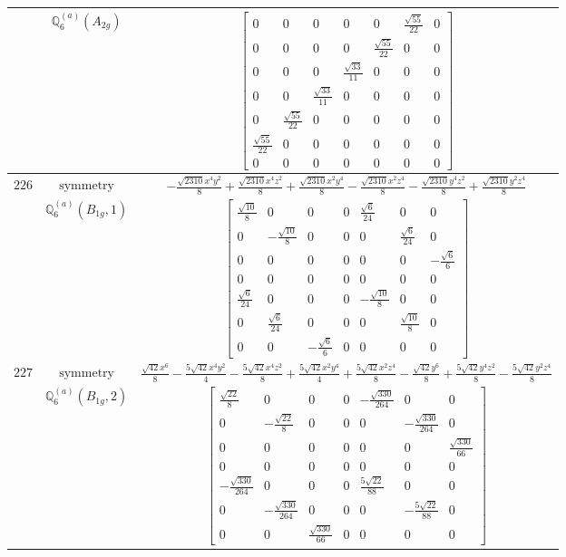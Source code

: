\documentclass[fleqn,8pt,landscape]{jsarticle}
\begin{document}
\begin{longtable}{ccc}
$  $ & $ \mathbb{Q}_{6}^{(a)}(A_{2g}) $ & $ \begin{bmatrix} 0 & 0 & 0 & 0 & 0 & \frac{\sqrt{55}}{22} & 0 \\ 0 & 0 & 0 & 0 & \frac{\sqrt{55}}{22} & 0 & 0 \\ 0 & 0 & 0 & \frac{\sqrt{33}}{11} & 0 & 0 & 0 \\ 0 & 0 & \frac{\sqrt{33}}{11} & 0 & 0 & 0 & 0 \\ 0 & \frac{\sqrt{55}}{22} & 0 & 0 & 0 & 0 & 0 \\ \frac{\sqrt{55}}{22} & 0 & 0 & 0 & 0 & 0 & 0 \\ 0 & 0 & 0 & 0 & 0 & 0 & 0 \end{bmatrix} $ \\ \hline
$ 226 $ & $ \text{symmetry} $ & $ - \frac{\sqrt{2310} x^{4} y^{2}}{8} + \frac{\sqrt{2310} x^{4} z^{2}}{8} + \frac{\sqrt{2310} x^{2} y^{4}}{8} - \frac{\sqrt{2310} x^{2} z^{4}}{8} - \frac{\sqrt{2310} y^{4} z^{2}}{8} + \frac{\sqrt{2310} y^{2} z^{4}}{8} $ \\
$  $ & $ \mathbb{Q}_{6}^{(a)}(B_{1g},1) $ & $ \begin{bmatrix} \frac{\sqrt{10}}{8} & 0 & 0 & 0 & \frac{\sqrt{6}}{24} & 0 & 0 \\ 0 & - \frac{\sqrt{10}}{8} & 0 & 0 & 0 & \frac{\sqrt{6}}{24} & 0 \\ 0 & 0 & 0 & 0 & 0 & 0 & - \frac{\sqrt{6}}{6} \\ 0 & 0 & 0 & 0 & 0 & 0 & 0 \\ \frac{\sqrt{6}}{24} & 0 & 0 & 0 & - \frac{\sqrt{10}}{8} & 0 & 0 \\ 0 & \frac{\sqrt{6}}{24} & 0 & 0 & 0 & \frac{\sqrt{10}}{8} & 0 \\ 0 & 0 & - \frac{\sqrt{6}}{6} & 0 & 0 & 0 & 0 \end{bmatrix} $ \\ \hline
$ 227 $ & $ \text{symmetry} $ & $ \frac{\sqrt{42} x^{6}}{8} - \frac{5 \sqrt{42} x^{4} y^{2}}{4} - \frac{5 \sqrt{42} x^{4} z^{2}}{8} + \frac{5 \sqrt{42} x^{2} y^{4}}{4} + \frac{5 \sqrt{42} x^{2} z^{4}}{8} - \frac{\sqrt{42} y^{6}}{8} + \frac{5 \sqrt{42} y^{4} z^{2}}{8} - \frac{5 \sqrt{42} y^{2} z^{4}}{8} $ \\
$  $ & $ \mathbb{Q}_{6}^{(a)}(B_{1g},2) $ & $ \begin{bmatrix} \frac{\sqrt{22}}{8} & 0 & 0 & 0 & - \frac{\sqrt{330}}{264} & 0 & 0 \\ 0 & - \frac{\sqrt{22}}{8} & 0 & 0 & 0 & - \frac{\sqrt{330}}{264} & 0 \\ 0 & 0 & 0 & 0 & 0 & 0 & \frac{\sqrt{330}}{66} \\ 0 & 0 & 0 & 0 & 0 & 0 & 0 \\ - \frac{\sqrt{330}}{264} & 0 & 0 & 0 & \frac{5 \sqrt{22}}{88} & 0 & 0 \\ 0 & - \frac{\sqrt{330}}{264} & 0 & 0 & 0 & - \frac{5 \sqrt{22}}{88} & 0 \\ 0 & 0 & \frac{\sqrt{330}}{66} & 0 & 0 & 0 & 0 \end{bmatrix} $ \\ \hline

\end{longtable}
\end{document}
